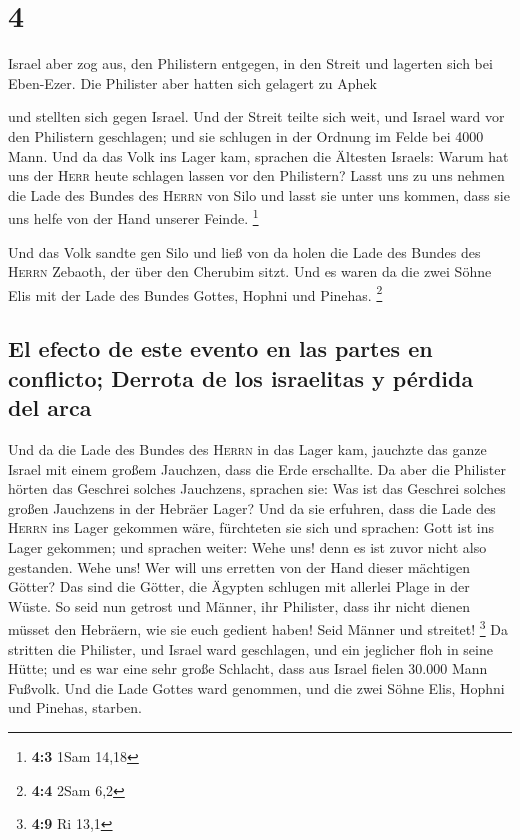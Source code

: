 \hypertarget{section-3}{%
\section{4}\label{section-3}}

 Israel aber zog aus, den Philistern entgegen, in den
Streit und lagerten sich bei Eben-Ezer. Die Philister aber hatten sich
gelagert zu Aphek

 und stellten sich gegen Israel. Und der Streit teilte
sich weit, und Israel ward vor den Philistern geschlagen; und sie
schlugen in der Ordnung im Felde bei 4000 Mann.  Und da
das Volk ins Lager kam, sprachen die Ältesten Israels: Warum hat uns der
\textsc{Herr} heute schlagen lassen vor den Philistern? Lasst uns zu uns
nehmen die Lade des Bundes des \textsc{Herrn} von Silo und lasst sie
unter uns kommen, dass sie uns helfe von der Hand unserer Feinde.
\footnote{\textbf{4:3} 1Sam 14,18}

 Und das Volk sandte gen Silo und ließ von da holen die
Lade des Bundes des \textsc{Herrn} Zebaoth, der über den Cherubim sitzt.
Und es waren da die zwei Söhne Elis mit der Lade des Bundes Gottes,
Hophni und Pinehas. \footnote{\textbf{4:4} 2Sam 6,2}

\hypertarget{el-efecto-de-este-evento-en-las-partes-en-conflicto-derrota-de-los-israelitas-y-puxe9rdida-del-arca}{%
\subsection{El efecto de este evento en las partes en conflicto; Derrota
de los israelitas y pérdida del
arca}\label{el-efecto-de-este-evento-en-las-partes-en-conflicto-derrota-de-los-israelitas-y-puxe9rdida-del-arca}}

 Und da die Lade des Bundes des \textsc{Herrn} in das
Lager kam, jauchzte das ganze Israel mit einem großem Jauchzen, dass die
Erde erschallte.  Da aber die Philister hörten das
Geschrei solches Jauchzens, sprachen sie: Was ist das Geschrei solches
großen Jauchzens in der Hebräer Lager? Und da sie erfuhren, dass die
Lade des \textsc{Herrn} ins Lager gekommen wäre, 
fürchteten sie sich und sprachen: Gott ist ins Lager gekommen; und
sprachen weiter: Wehe uns! denn es ist zuvor nicht also gestanden.
 Wehe uns! Wer will uns erretten von der Hand dieser
mächtigen Götter? Das sind die Götter, die Ägypten schlugen mit allerlei
Plage in der Wüste.  So seid nun getrost und Männer, ihr
Philister, dass ihr nicht dienen müsset den Hebräern, wie sie euch
gedient haben! Seid Männer und streitet! \footnote{\textbf{4:9} Ri 13,1}
 Da stritten die Philister, und Israel ward geschlagen,
und ein jeglicher floh in seine Hütte; und es war eine sehr große
Schlacht, dass aus Israel fielen 30.000 Mann Fußvolk. 
Und die Lade Gottes ward genommen, und die zwei Söhne Elis, Hophni und
Pinehas, starben.

